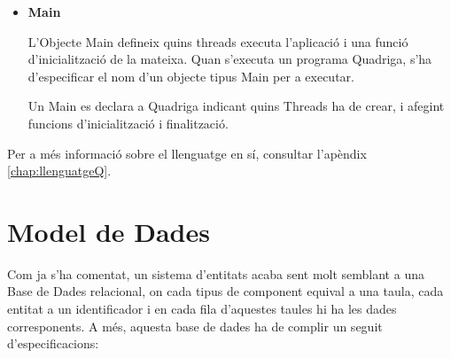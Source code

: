 \begin{itemize}
    \item{\bf Main}

      L'Objecte Main defineix quins threads executa l'aplicació i una funció d'inicialització de la mateixa. Quan s'executa un programa Quadriga, s'ha d'especificar el nom d'un objecte tipus Main per a executar.
    
      Un Main es declara a Quadriga indicant quins Threads ha de crear, i afegint funcions d'inicialització i finalització.
    
  \end{itemize}
  
  Per a més informació sobre el llenguatge en sí, consultar l'apèndix \ref{chap:llenguatgeQ}.

\section{Model de Dades}

  Com ja s'ha comentat, un sistema d'entitats acaba sent molt semblant a una Base de Dades relacional, on cada tipus de component equival a una taula, cada entitat a un identificador i en cada fila d'aquestes taules hi ha les dades corresponents. A més, aquesta base de dades ha de complir un seguit d'especificacions:

